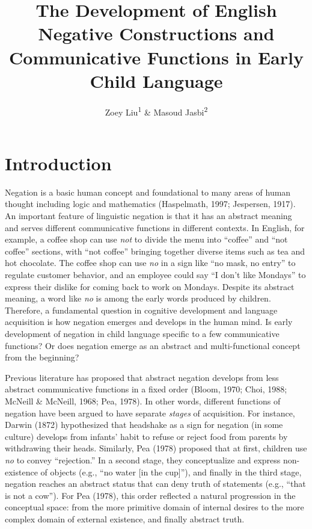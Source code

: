 \documentclass[
  english,
  man,floatsintext]{apa6}
\title{The Development of English Negative Constructions and Communicative Functions in Early Child Language}
\author{Zoey Liu\textsuperscript{1} \& Masoud Jasbi\textsuperscript{2}}
\date{}
\affiliation{\vspace{0.5cm}\textsuperscript{1} Boston College\\\textsuperscript{2} Uinversity of California, Davis}
\begin{document}
\maketitle

\hypertarget{introduction}{%
\section{Introduction}\label{introduction}}

Negation is a basic human concept and foundational to many areas of human thought including logic and mathematics (Haspelmath, 1997; Jespersen, 1917). An important feature of linguistic negation is that it has an abstract meaning and serves different communicative functions in different contexts. In English, for example, a coffee shop can use \emph{not} to divide the menu into ``coffee'' and ``not coffee'' sections, with ``not coffee'' bringing together diverse items such as tea and hot chocolate. The coffee shop can use \emph{no} in a sign like ``no mask, no entry'' to regulate customer behavior, and an employee could say ``I don't like Mondays'' to express their dislike for coming back to work on Mondays. Despite its abstract meaning, a word like \emph{no} is among the early words produced by children. Therefore, a fundamental question in cognitive development and language acquisition is how negation emerges and develops in the human mind. Is early development of negation in child language specific to a few communicative functions? Or does negation emerge as an abstract and multi-functional concept from the beginning?

Previous literature has proposed that abstract negation develops from less abstract communicative functions in a fixed order (Bloom, 1970; Choi, 1988; McNeill \& McNeill, 1968; Pea, 1978). In other words, different functions of negation have been argued to have separate \emph{stages} of acquisition. For instance, Darwin (1872) hypothesized that headshake as a sign for negation (in some culture) develops from infants' habit to refuse or reject food from parents by withdrawing their heads. Similarly, Pea (1978) proposed that at first, children use \emph{no} to convey ``rejection.'' In a second stage, they conceptualize and express non-existence of objects (e.g., ``no water {[}in the cup{]}''), and finally in the third stage, negation reaches an abstract status that can deny truth of statements (e.g., ``that is not a cow''). For Pea (1978), this order reflected a natural progression in the conceptual space: from the more primitive domain of internal desires to the more complex domain of external existence, and finally abstract truth.
\end{document}
